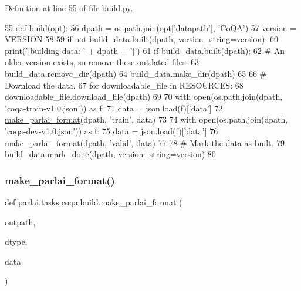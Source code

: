 Definition at line 55 of file build.\+py.


\begin{DoxyCode}
55 \textcolor{keyword}{def }\hyperlink{namespacedialog__babi__feedback_1_1build_a7a9d289f7493a5ded13c4b7f071b6184}{build}(opt):
56     dpath = os.path.join(opt[\textcolor{stringliteral}{'datapath'}], \textcolor{stringliteral}{'CoQA'})
57     version = VERSION
58 
59     \textcolor{keywordflow}{if} \textcolor{keywordflow}{not} build\_data.built(dpath, version\_string=version):
60         print(\textcolor{stringliteral}{'[building data: '} + dpath + \textcolor{stringliteral}{']'})
61         \textcolor{keywordflow}{if} build\_data.built(dpath):
62             \textcolor{comment}{# An older version exists, so remove these outdated files.}
63             build\_data.remove\_dir(dpath)
64         build\_data.make\_dir(dpath)
65 
66         \textcolor{comment}{# Download the data.}
67         \textcolor{keywordflow}{for} downloadable\_file \textcolor{keywordflow}{in} RESOURCES:
68             downloadable\_file.download\_file(dpath)
69 
70         with open(os.path.join(dpath, \textcolor{stringliteral}{'coqa-train-v1.0.json'})) \textcolor{keyword}{as} f:
71             data = json.load(f)[\textcolor{stringliteral}{'data'}]
72             \hyperlink{namespaceparlai_1_1tasks_1_1quac_1_1build_a08c212462b5c58cde91192d35f24f0cc}{make\_parlai\_format}(dpath, \textcolor{stringliteral}{'train'}, data)
73 
74         with open(os.path.join(dpath, \textcolor{stringliteral}{'coqa-dev-v1.0.json'})) \textcolor{keyword}{as} f:
75             data = json.load(f)[\textcolor{stringliteral}{'data'}]
76             \hyperlink{namespaceparlai_1_1tasks_1_1quac_1_1build_a08c212462b5c58cde91192d35f24f0cc}{make\_parlai\_format}(dpath, \textcolor{stringliteral}{'valid'}, data)
77 
78         \textcolor{comment}{# Mark the data as built.}
79         build\_data.mark\_done(dpath, version\_string=version)
80 \end{DoxyCode}
\mbox{\label{namespaceparlai_1_1tasks_1_1coqa_1_1build_ae2bc52f1ecab4681f1c2ebf013629aec}} 
\subsubsection{\texorpdfstring{make\+\_\+parlai\+\_\+format()}{make\_parlai\_format()}}
{\footnotesize\ttfamily def parlai.\+tasks.\+coqa.\+build.\+make\+\_\+parlai\+\_\+format (\begin{DoxyParamCaption}\item[{}]{outpath,  }\item[{}]{dtype,  }\item[{}]{data }\end{DoxyParamCaption})}



